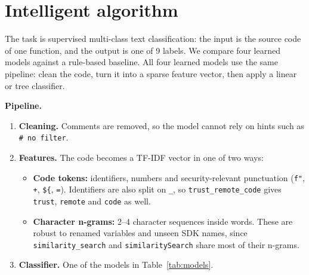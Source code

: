 \documentclass[11pt,a4paper]{article}
\newcommand{\code}[1]{\texttt{#1}}
\begin{document}
\section{Intelligent algorithm}
\label{sec:algo}

The task is supervised multi-class text classification: the input is the source code of
one function, and the output is one of 9 labels. We compare four learned models against a
rule-based baseline. All four learned models use the same pipeline: clean the code, turn
it into a sparse feature vector, then apply a linear or tree classifier.

\textbf{Pipeline.}
\begin{enumerate}
  \item \textbf{Cleaning.} Comments are removed, so the model cannot rely on hints such as
        \code{\# no filter}.
  \item \textbf{Features.} The code becomes a TF-IDF vector in one of two ways:
  \begin{itemize}
    \item \textbf{Code tokens:} identifiers, numbers and security-relevant punctuation
          (\code{f"}, \code{+}, \code{\$\{}, \code{=}). Identifiers are also split on
          \code{\_}, so \code{trust\_remote\_code} gives \code{trust}, \code{remote} and
          \code{code} as well.
    \item \textbf{Character n-grams:} 2--4 character sequences inside words. These are
          robust to renamed variables and unseen SDK names, since
          \code{similarity\_search} and \code{similaritySearch} share most of their
          n-grams.
  \end{itemize}
  \item \textbf{Classifier.} One of the models in Table~\ref{tab:models}.
\end{enumerate}
\end{document}
